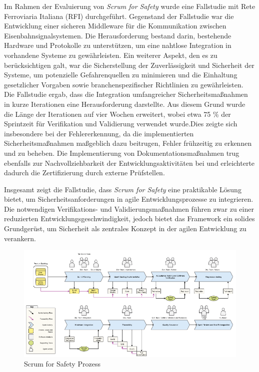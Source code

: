 \documentclass[acmtog]{acmart}
\begin{document}
Im Rahmen der Evaluierung von \textit{Scrum for Safety} wurde eine Fallstudie mit Rete Ferroviaria Italiana (RFI) durchgeführt. Gegenstand der Fallstudie war die Entwicklung einer sicheren Middleware für die Kommunikation zwischen Eisenbahnsignalsystemen. 
Die Herausforderung bestand darin, bestehende Hardware und Protokolle zu unterstützen, um eine nahtlose Integration in vorhandene Systeme zu gewährleisten. Ein weiterer Aspekt, den es zu berücksichtigen galt, 
war die Sicherstellung der Zuverlässigkeit und Sicherheit der Systeme, um potenzielle Gefahrenquellen zu minimieren und die Einhaltung gesetzlicher Vorgaben sowie branchenspezifischer Richtlinien zu gewährleisten. Die Fallstudie ergab, 
dass die Integration umfangreicher Sicherheitsmaßnahmen in kurze Iterationen eine Herausforderung darstellte. \cite{barbareschi_scrum_2022}
Aus diesem Grund wurde die Länge der Iterationen auf vier Wochen erweitert, wobei etwa 75 \% der Sprintzeit für Verifikation und Validierung verwendet wurde.Dies zeigte sich insbesondere bei der Fehlererkennung, 
da die implementierten Sicherheitsmaßnahmen maßgeblich dazu beitrugen, Fehler frühzeitig zu erkennen und zu beheben. 
Die Implementierung von Dokumentationsmaßnahmen trug ebenfalls zur Nachvollziehbarkeit der Entwicklungsaktivitäten bei und erleichterte dadurch die Zertifizierung durch externe Prüfstellen. \cite{barbareschi_scrum_2022}

Insgesamt zeigt die Fallstudie, dass \textit{Scrum for Safety} eine praktikable Lösung bietet, um Sicherheitsanforderungen in agile Entwicklungsprozesse zu integrieren.
Die notwendigen Verifikations- und Validierungsmaßnahmen führen zwar zu einer reduzierten Entwicklungsgeschwindigkeit, jedoch bietet das Framework ein solides Grundgerüst, um Sicherheit als zentrales
Konzept in der agilen Entwicklung zu verankern. \cite{barbareschi_scrum_2022}

\begin{figure}
  \centering
  \includegraphics[width=0.9\linewidth]{images/S4S-Safe-Sprint.png}
  \caption{Scrum for Safety Prozess}
  \label{fig:scrum4safety}
\end{figure}
\end{document}
